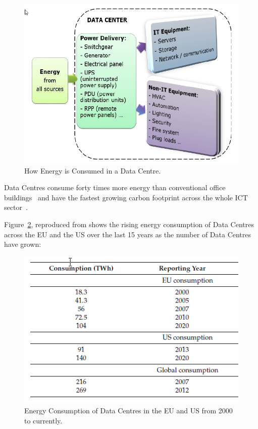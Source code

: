 \documentclass[12pt]{scrartcl}
\begin{document}
\begin{figure}[h]
  \caption{How Energy is Consumed in a Data Centre.}
  \label{fig:DCenergy}
  \centering
    \includegraphics[scale=0.35]{Data_center_energy}
\end{figure}


Data Centres consume forty times more energy than conventional office buildings~\citep{edsdoj.99f37e7899fb4fcaabdaa81e395626c420180101} and have the fastest growing carbon footprint across the whole ICT sector~\citep{edsbas.13818AC20170101}.

Figure~\ref{fig:DCenergyEU-US}, reproduced from \citet{edsbas.13818AC20170101} shows the rising energy consumption of Data Centres across the EU and the US over the last 15 years as the number of Data Centres have grown:

\begin{figure}[h]
  \caption{Energy Consumption of Data Centres in the EU and US from 2000 to currently.}
  \label{fig:DCenergyEU-US}
  \centering
    \includegraphics[scale=0.45]{Energy_consumption}
\end{figure}
\end{document}
